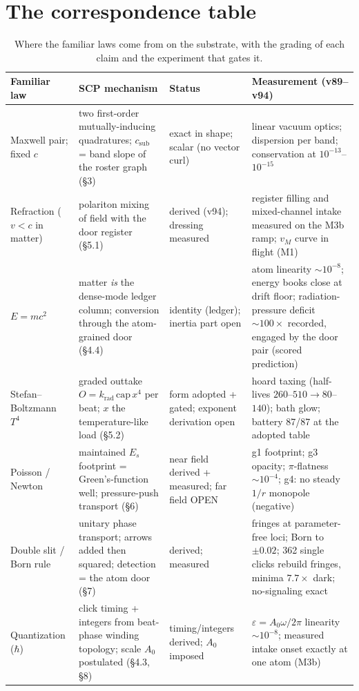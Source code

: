 \section{The correspondence table}\label{the-correspondence-table}

\begin{table}[t]
\centering
\small
\begin{tabular}{p{2.6cm} p{5.4cm} p{2.2cm} p{5.6cm}}
\hline
\textbf{Familiar law} & \textbf{SCP mechanism} & \textbf{Status} &
\textbf{Measurement (v89--v94)} \\
\hline
Maxwell pair; fixed $c$ &
two first-order mutually-inducing quadratures; $c_{\mathrm{sub}}$ = band
slope of the roster graph (\S3) &
exact in shape; scalar (no vector curl) &
linear vacuum optics; dispersion per band; conservation at
$10^{-13}$--$10^{-15}$ \\
Refraction ($v<c$ in matter) &
polariton mixing of field with the door register (\S5.1) &
derived (v94); dressing measured &
register filling and mixed-channel intake measured on the M3b ramp;
$v_M$ curve in flight (M1) \\
$E=mc^2$ &
matter \emph{is} the dense-mode ledger column; conversion through the
atom-grained door (\S4.4) &
identity (ledger); inertia part open &
atom linearity $\sim 10^{-8}$; energy books close at drift floor;
radiation-pressure deficit $\sim 100\times$ recorded, engaged by the
door pair (scored prediction) \\
Stefan--Boltzmann $T^4$ &
graded outtake $O = k_{\mathrm{rad}}\,\mathrm{cap}\,x^4$ per beat; $x$
the temperature-like load (\S5.2) &
form adopted + gated; exponent derivation open &
hoard taxing (half-lives $260$--$510 \to 80$--$140$); bath glow; battery
87/87 at the adopted table \\
Poisson / Newton &
maintained $E_s$ footprint = Green's-function well; pressure-push
transport (\S6) &
near field derived + measured; far field OPEN &
g1 footprint; g3 opacity; $\pi$-flatness $\sim 10^{-4}$; g4: no steady
$1/r$ monopole (negative) \\
Double slit / Born rule &
unitary phase transport; arrows added then squared; detection = the atom
door (\S7) &
derived; measured &
fringes at parameter-free loci; Born to $\pm0.02$; 362 single clicks
rebuild fringes, minima $7.7\times$ dark; no-signaling exact \\
Quantization ($\hbar$) &
click timing + integers from beat-phase winding topology; scale $A_0$
postulated (\S4.3, \S8) &
timing/integers derived; $A_0$ imposed &
$\varepsilon = A_0\omega/2\pi$ linearity $\sim 10^{-8}$; measured intake
onset exactly at one atom (M3b) \\
\hline
\end{tabular}
\caption{Where the familiar laws come from on the substrate, with the
grading of each claim and the experiment that gates it.}
\label{tab:corr}
\end{table}

